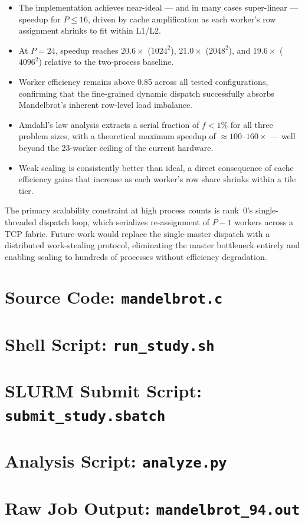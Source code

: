 \documentclass[11pt]{article}
\begin{document}
\begin{itemize}
  \item The implementation achieves near-ideal — and in many cases super-linear
        — speedup for $P \leq 16$, driven by cache amplification as each
        worker's row assignment shrinks to fit within L1/L2.
  \item At $P = 24$, speedup reaches $20.6\times$ ($1024^2$), $21.0\times$
        ($2048^2$), and $19.6\times$ ($4096^2$) relative to the two-process
        baseline.
  \item Worker efficiency remains above 0.85 across all tested configurations,
        confirming that the fine-grained dynamic dispatch successfully absorbs
        Mandelbrot's inherent row-level load imbalance.
  \item Amdahl's law analysis extracts a serial fraction of $f < 1\%$ for all
        three problem sizes, with a theoretical maximum speedup of
        $\approx 100$--$160\times$ — well beyond the 23-worker ceiling of the
        current hardware.
  \item Weak scaling is consistently better than ideal, a direct consequence of
        cache efficiency gains that increase as each worker's row share shrinks
        within a tile tier.
\end{itemize}

The primary scalability constraint at high process counts is rank~0's
single-threaded dispatch loop, which serializes re-assignment of $P-1$ workers
across a TCP fabric. Future work would replace the single-master dispatch with
a distributed work-stealing protocol, eliminating the master bottleneck
entirely and enabling scaling to hundreds of processes without efficiency
degradation.

\newpage
\appendix

\section{Source Code: \texttt{mandelbrot.c}}


\newpage
\section{Shell Script: \texttt{run\_study.sh}}


\newpage
\section{SLURM Submit Script: \texttt{submit\_study.sbatch}}


\newpage
\section{Analysis Script: \texttt{analyze.py}}


\newpage
\section{Raw Job Output: \texttt{mandelbrot\_94.out}}

\end{document}
